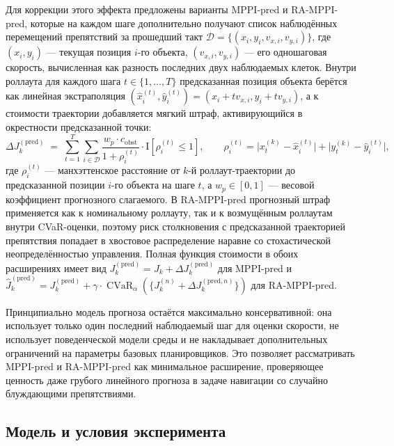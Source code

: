 \documentclass[a4paper,12pt]{extarticle}
\begin{document}
    Для коррекции этого эффекта предложены варианты MPPI-pred и RA-MPPI-pred,
    которые на каждом шаге дополнительно получают список наблюдённых перемещений
    препятствий за прошедший такт $\mathcal{D} = \{(x_i, y_i, v_{x,i}, v_{y,i})\}$,
    где $(x_i, y_i)$ --- текущая позиция $i$-го объекта, $(v_{x,i}, v_{y,i})$ --- его
    одношаговая скорость, вычисленная как разность последних двух наблюдаемых клеток.
    Внутри роллаута для каждого шага $t \in \{1, \dots, T\}$ предсказанная позиция
    объекта берётся как линейная экстраполяция $(\hat{x}_i^{(t)}, \hat{y}_i^{(t)}) =
    (x_i + t v_{x,i}, y_i + t v_{y,i})$, а к стоимости траектории добавляется
    мягкий штраф, активирующийся в окрестности предсказанной точки:
    $$
    \Delta J^{(\text{pred})}_k \;=\; \sum_{t=1}^{T} \sum_{i \in \mathcal{D}}
    \frac{w_p \cdot c_{\text{obst}}}{1 + \rho_i^{(t)}} \cdot
    \mathrm{I}\!\left[\rho_i^{(t)} \le 1\right],
    \qquad
    \rho_i^{(t)} = \bigl|x^{(k)}_t - \hat{x}_i^{(t)}\bigr| +
                   \bigl|y^{(k)}_t - \hat{y}_i^{(t)}\bigr|,
    $$
    где $\rho_i^{(t)}$ --- манхэттенское расстояние от $k$-й роллаут-траектории до
    предсказанной позиции $i$-го объекта на шаге $t$, а $w_p \in [0, 1]$ --- весовой
    коэффициент прогнозного слагаемого. В RA-MPPI-pred прогнозный штраф применяется как
    к номинальному роллауту, так и к возмущённым роллаутам внутри CVaR-оценки,
    поэтому риск столкновения с предсказанной траекторией препятствия попадает
    в хвостовое распределение наравне со стохастической неопределённостью управления.
    Полная функция стоимости в обоих расширениях имеет вид
    $J^{(\text{pred})}_k = J_k + \Delta J^{(\text{pred})}_k$
    для MPPI-pred и
    $\widehat{J}^{(\text{pred})}_k = J^{(\text{pred})}_k + \gamma \cdot \operatorname{CVaR}_{\alpha}(\{J_k^{(n)} + \Delta J^{(\text{pred}, n)}_k\})$
    для RA-MPPI-pred.

    Принципиально модель прогноза остаётся максимально консервативной:
    она использует только один последний наблюдаемый шаг для оценки скорости,
    не использует поведенческой модели среды и не накладывает дополнительных ограничений
    на параметры базовых планировщиков. Это позволяет рассматривать MPPI-pred и RA-MPPI-pred
    как минимальное расширение, проверяющее ценность даже грубого линейного прогноза
    в задаче навигации со случайно блуждающими препятствиями.

    \subsection{Модель и условия эксперимента}
\end{document}

